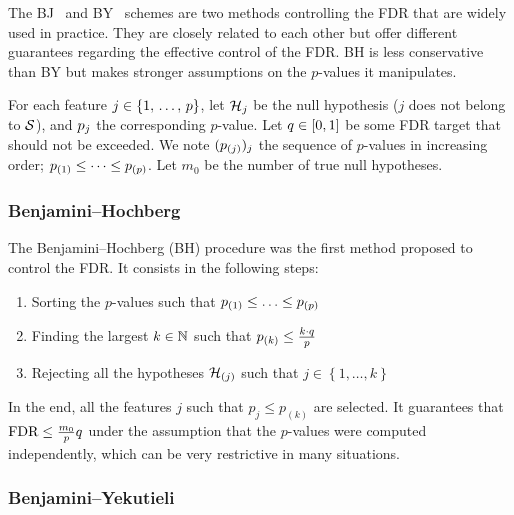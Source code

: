 The BJ~\citep{bh} and BY~\citep{by} schemes are two methods controlling the FDR
that are widely used in practice.
They are closely related to each other but offer different guarantees regarding the effective control of the FDR\@.
BH is less conservative than BY but makes stronger assumptions on the $p$-values it manipulates.

For each feature $j \in \left\{ 1,\, \dots,\, p \right\}$, let $\mathcal{H}_j$ be the null hypothesis ($j$ does not belong to $\mathcal{S}$),
and $p_j$ the corresponding $p$-value.
Let $q \in [0, 1]$ be some FDR target that should not be exceeded.
We note $(p_{(j)})_j$ the sequence of $p$-values in increasing order;
$p_{(1)} \leq \dots \leq p_{(p)}$.
Let $m_0$ be the number of true null hypotheses.

\subsubsection{Benjamini–Hochberg}\label{subsubsec:bh}

The Benjamini–Hochberg (BH) procedure was the first method proposed to control the FDR\@.
It consists in the following steps:
\begin{enumerate}
    \item Sorting the $p$-values such that $p_{(1)} \leq \ldots \leq p_{(p)}$
    \item Finding the largest $k \in \mathbb{N}$ such that $p_{(k)} \leq \frac{k \cdot q}{p}$
    \item Rejecting all the hypotheses $\mathcal{H}_{(j)}$ such that $j \in \left\{ 1, \dots, k \right\}$
\end{enumerate}
In the end, all the features $j$ such that $p_j \leq p_{(k)}$ are selected.
It guarantees that $\text{FDR} \leq \frac{m_0}{p}q$ under the assumption that the $p$-values were computed
independently, which can be very restrictive in many situations.

\subsubsection{Benjamini–Yekutieli}\label{subsubsec:by}

